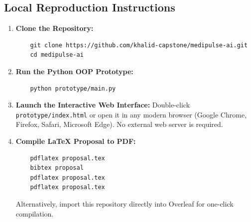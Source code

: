 \documentclass[11pt,a4paper]{article}
\begin{document}
\subsection{Local Reproduction Instructions}
\begin{enumerate}
    \item \textbf{Clone the Repository:}
    \begin{verbatim}
    git clone https://github.com/khalid-capstone/medipulse-ai.git
    cd medipulse-ai
    \end{verbatim}
    
    \item \textbf{Run the Python OOP Prototype:}
    \begin{verbatim}
    python prototype/main.py
    \end{verbatim}

    \item \textbf{Launch the Interactive Web Interface:}
    Double-click \texttt{prototype/index.html} or open it in any modern browser (Google Chrome, Firefox, Safari, Microsoft Edge). No external web server is required.

    \item \textbf{Compile LaTeX Proposal to PDF:}
    \begin{verbatim}
    pdflatex proposal.tex
    bibtex proposal
    pdflatex proposal.tex
    pdflatex proposal.tex
    \end{verbatim}
    Alternatively, import this repository directly into Overleaf for one-click compilation.
\end{enumerate}
\end{document}
